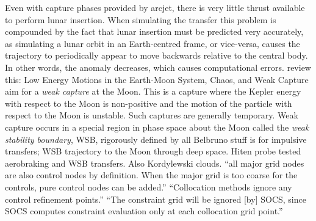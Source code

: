 

Even with capture phases provided by arcjet, there is very little thrust available to perform lunar insertion. When simulating the transfer this problem is compounded by the fact that lunar insertion must be predicted very accurately, as simulating a lunar orbit in an Earth-centred frame, or vice-versa, causes the trajectory to periodically appear to move backwards relative to the central body. In other words, the anomaly decreases, which causes computational errors.
review this: Low Energy Motions in the Earth-Moon System, Chaos, and Weak Capture \parencite{Belbruno2007}
aim for a \emph{weak capture} at the Moon. This is a capture where the Kepler energy with respect to the Moon is non-positive and the motion of the particle with respect to the Moon is unstable. Such captures are generally temporary. Weak capture occurs in a special region in phase space about the Moon called the \emph{weak stability boundary}, WSB, rigorously defined by \textcite{Belbruno2004}
all Belbruno stuff is for impulsive transfers; WSB trajectory to the Moon through deep space.
Hiten probe tested aerobraking and WSB transfers. Also Kordylewski clouds.
\cite{ASTOS_guide} \enquote{all major grid nodes are also control nodes by definition. When the major grid is too coarse for the controls, pure control nodes can be added.} \enquote{Collocation methods ignore any control refinement points.} \enquote{The constraint grid will be ignored [by] SOCS, since SOCS computes constraint evaluation only at each collocation grid point.}
